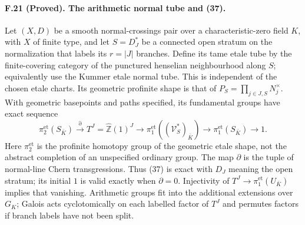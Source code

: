 \paragraph{F.21 (Proved). The arithmetic
normal tube and (37).}
Let $(X,D)$ be a smooth normal-crossings pair over a characteristic-zero
field $K$, with $X$ of finite type, and let $S=D_J^*$ be a connected
open stratum on the normalization that labels its $r=|J|$ branches.
Define its tame etale tube by the finite-covering category of the
punctured henselian neighbourhood along $S$; equivalently use the
Kummer etale normal tube. This is independent of the chosen etale
charts. Its geometric profinite shape is that of
$P_S=\prod_{j\in J,S}N_j^\times$. With geometric basepoints and
paths specified, its fundamental groups have exact sequence
\[
 \pi_2^{\mathrm{et}}(S_{\bar K})
 \xrightarrow{\partial}
 T^J=\widehat{\mathbb Z}(1)^J
 \longrightarrow\pi_1^{\mathrm{et}}((\mathcal V_S^*)_{\bar K})
 \longrightarrow\pi_1^{\mathrm{et}}(S_{\bar K})\longrightarrow1.
\]
Here $\pi_2^{\mathrm{et}}$ is the profinite homotopy group of the
geometric etale shape, not the abstract completion of an unspecified
ordinary group. The map $\partial$ is the tuple of normal-line Chern
transgressions. Thus (37) is exact with $D_J$ meaning the open stratum;
its initial $1$ is valid exactly when $\partial=0$. Injectivity of
$T^J\to\pi_1^{\mathrm{et}}(U_{\bar K})$ implies that vanishing.
Arithmetic groups fit into the additional extensions over $G_K$;
Galois acts cyclotomically on each labelled factor of $T^J$ and
permutes factors if branch labels have not been split.

